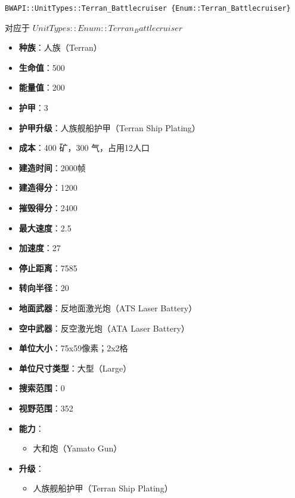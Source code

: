 \begin{tcolorbox}[colback=white, colframe=black!60!white, title=Terran\_Battlecruiser(), arc=0mm]
    \begin{verbatim}
BWAPI::UnitTypes::Terran_Battlecruiser {Enum::Terran_Battlecruiser}
    \end{verbatim}
    对应于  $ UnitTypes::Enum::Terran_Battlecruiser $ 
    
    \begin{itemize}
        \item \textbf{种族}：人族（Terran）
        \item \textbf{生命值}：500
        \item \textbf{能量值}：200
        \item \textbf{护甲}：3
        \item \textbf{护甲升级}：人族舰船护甲（Terran Ship Plating）
        \item \textbf{成本}：400 矿，300 气，占用12人口
        \item \textbf{建造时间}：2000帧
        \item \textbf{建造得分}：1200
        \item \textbf{摧毁得分}：2400
        \item \textbf{最大速度}：2.5
        \item \textbf{加速度}：27
        \item \textbf{停止距离}：7585
        \item \textbf{转向半径}：20
        \item \textbf{地面武器}：反地面激光炮（ATS Laser Battery）
        \item \textbf{空中武器}：反空激光炮（ATA Laser Battery）
        \item \textbf{单位大小}：75x59像素；2x2格
        \item \textbf{单位尺寸类型}：大型（Large）
        \item \textbf{搜索范围}：0
        \item \textbf{视野范围}：352
        \item \textbf{能力}：
            \begin{itemize}
                \item 大和炮（Yamato Gun）
            \end{itemize}
        \item \textbf{升级}：
            \begin{itemize}
                \item 人族舰船护甲（Terran Ship Plating）

\end{itemize}
\end{itemize}
\end{tcolorbox}

